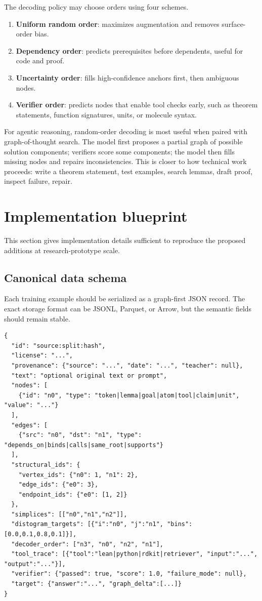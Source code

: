 \documentclass[11pt]{article}
\newcommand{\1}{\mathbf{1}}
\begin{document}
The decoding policy may choose orders using four schemes.

\begin{enumerate}
\item \textbf{Uniform random order}: maximizes augmentation and removes surface-order bias.
\item \textbf{Dependency order}: predicts prerequisites before dependents, useful for code and proof.
\item \textbf{Uncertainty order}: fills high-confidence anchors first, then ambiguous nodes.
\item \textbf{Verifier order}: predicts nodes that enable tool checks early, such as theorem statements, function signatures, units, or molecule syntax.
\end{enumerate}

For agentic reasoning, random-order decoding is most useful when paired with graph-of-thought search. The model first proposes a partial graph of possible solution components; verifiers score some components; the model then fills missing nodes and repairs inconsistencies. This is closer to how technical work proceeds: write a theorem statement, test examples, search lemmas, draft proof, inspect failure, repair.

\section{Implementation blueprint}
\label{sec:implementation-blueprint}

This section gives implementation details sufficient to reproduce the proposed additions at research-prototype scale.

\subsection{Canonical data schema}

Each training example should be serialized as a graph-first JSON record. The exact storage format can be JSONL, Parquet, or Arrow, but the semantic fields should remain stable.

\begin{lstlisting}[caption={Minimal graph-first training record.}]
{
  "id": "source:split:hash",
  "license": "...",
  "provenance": {"source": "...", "date": "...", "teacher": null},
  "text": "optional original text or prompt",
  "nodes": [
    {"id": "n0", "type": "token|lemma|goal|atom|tool|claim|unit", "value": "..."}
  ],
  "edges": [
    {"src": "n0", "dst": "n1", "type": "depends_on|binds|calls|same_root|supports"}
  ],
  "structural_ids": {
    "vertex_ids": {"n0": 1, "n1": 2},
    "edge_ids": {"e0": 3},
    "endpoint_ids": {"e0": [1, 2]}
  },
  "simplices": [["n0","n1","n2"]],
  "distogram_targets": [{"i":"n0", "j":"n1", "bins":[0.0,0.1,0.8,0.1]}],
  "decoder_order": ["n3", "n0", "n2", "n1"],
  "tool_trace": [{"tool":"lean|python|rdkit|retriever", "input":"...", "output":"..."}],
  "verifier": {"passed": true, "score": 1.0, "failure_mode": null},
  "target": {"answer":"...", "graph_delta":[...]}
}
\end{lstlisting}
\end{document}

